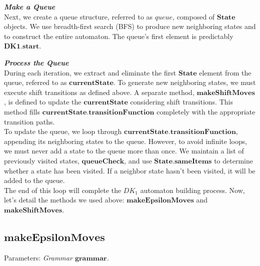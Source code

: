 \vspace{15pt}

\textbf{\textit{Make a Queue}}\\

Next, we create a queue structure, referred to as \(queue\), composed of \(\boldsymbol{State}\) objects. We use breadth-first search (BFS) to produce new neighboring states and to construct the entire automaton. The queue's first element is predictably \(\boldsymbol{DK1.start}\).\\

\vspace{15pt}

\textbf{\textit{Process the Queue}}\\

During each iteration, we extract and eliminate the first \(\boldsymbol{State}\) element from the queue, referred to as \(\boldsymbol{currentState}\). To generate new neighboring states, we must execute shift transitions as defined above. A separate method, \(\boldsymbol{makeShiftMoves}\), is defined to update the \(\boldsymbol{currentState}\) considering shift transitions. This method fills \(\boldsymbol{currentState.transitionFunction}\) completely with the appropriate transition paths.\\

To update the queue, we loop through \(\boldsymbol{currentState.transitionFunction}\), appending its neighboring states to the queue. However, to avoid infinite loops, we must never add a state to the queue more than once. We maintain a list of previously visited states, \(\boldsymbol{queueCheck}\), and use \(\boldsymbol{State.sameItems}\) to determine whether a state has been visited. If a neighbor state hasn't been visited, it will be added to the queue.\\

The end of this loop will complete the \(DK_{1}\) automaton building process. Now, let's detail the methods we used above: \(\boldsymbol{makeEpsilonMoves}\) and \(\boldsymbol{makeShiftMoves}\).

\vspace{30pt}

\subsection{\(\boldsymbol{makeEpsilonMoves}\)}

Parameters: \textit{Grammar \(\boldsymbol{grammar}\).}

